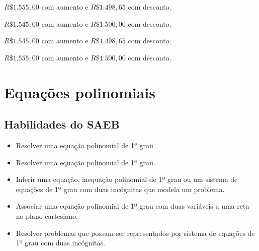 \begin{escolha}
\item $R\$ 1.555,00$ com aumento e $R\$ 1.498,65$ com desconto.
\item $R\$ 1.545,00$ com aumento e $R\$ 1.500,00$ com desconto.
\item $R\$ 1.545,00$ com aumento e $R\$ 1.498,65$ com desconto.
\item $R\$ 1.555,00$ com aumento e $R\$ 1.500,00$ com desconto.
\end{escolha}



\chapter{Equações polinomiais}

\section*{Habilidades do SAEB} 
\begin{itemize}
\item Resolver uma equação polinomial de 1º grau.
\item
 Resolver uma equação polinomial de 1º grau.
\item
  Inferir uma equação, inequação polinomial de 1º grau ou um sistema de
  equações de 1º grau com duas incógnitas que modela um problema.
\item
  Associar uma equação polinomial de 1º grau com duas variáveis a uma
  reta no plano cartesiano.
\item
  Resolver problemas que possam ser representados por sistema de
  equações de 1º grau com duas incógnitas.
\end{itemize}

